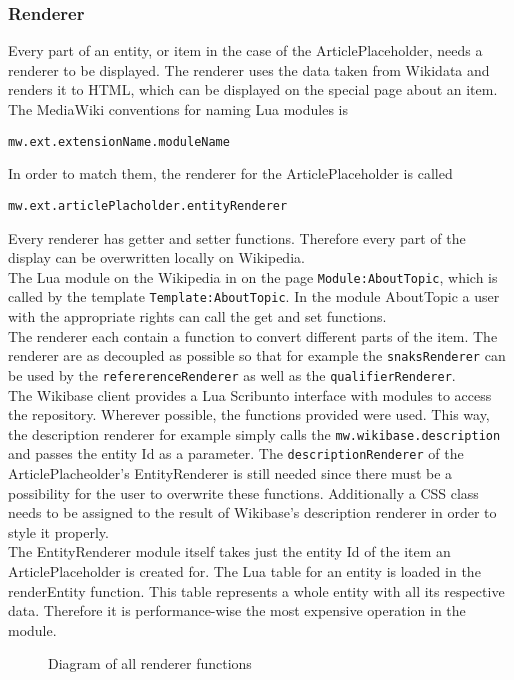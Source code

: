 \subsubsection{Renderer}

Every part of an entity, or item in the case of the ArticlePlaceholder, needs a renderer to be displayed. The renderer uses the data taken from Wikidata and renders it to HTML, which can be displayed on the special page about an item. \\
The MediaWiki conventions for naming Lua modules is 
\begin{center}
\texttt{mw.ext.extensionName.moduleName} 
\end{center}
In order to match them, the renderer for the ArticlePlaceholder is called 
\begin{center}
\texttt{mw.ext.articlePlacholder.entityRenderer}
\end{center}
Every renderer has getter and setter functions. Therefore every part of the display can be overwritten locally on Wikipedia. \\
The Lua module on the Wikipedia in on the page \texttt{Module:AboutTopic}, which is called by the template \texttt{Template:AboutTopic}. In the module AboutTopic a user with the appropriate rights can call the get and set functions. \\
The renderer each contain a function to convert different parts of the item. The renderer are as decoupled as possible so that for example the \texttt{snaksRenderer} can be used by the \texttt{refererenceRenderer} as well as the \texttt{qualifierRenderer}. \\
The Wikibase client provides a Lua Scribunto interface with modules to access the repository. Wherever possible, the functions provided were used. This way, the description renderer for example simply calls the \texttt{mw.wikibase.description} and passes the entity Id as a parameter. The \texttt{descriptionRenderer} of the ArticlePlacheolder's EntityRenderer is still needed since there must be a possibility for the user to overwrite these functions. Additionally a CSS class needs to be assigned to the result of Wikibase's description renderer in order to style it properly. \\
The EntityRenderer module itself takes just the entity Id of the item an ArticlePlaceholder is created for. The Lua table for an entity is loaded in the renderEntity function. This table represents a whole entity with all its respective data. Therefore it is performance-wise the most expensive operation in the module. \\

\begin{figure}[ht]
	\centering
	
	\caption{Diagram of all renderer functions}
	\label{fig:renderer}
\end{figure}


